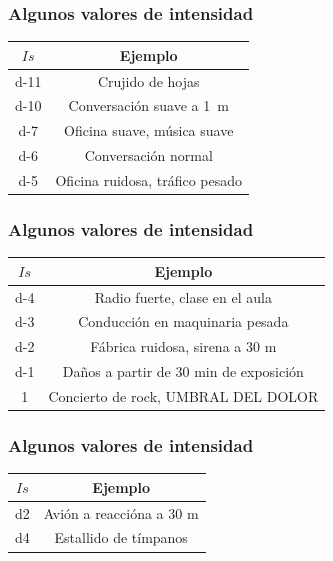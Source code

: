 \documentclass[14pt]{beamer}
\begin{document}
\begin{frame}
\frametitle{Algunos valores de intensidad}
\begin{table}
    \renewcommand{\arraystretch}{0.8}
    \centering
    \begin{tabular}{c | c }
        $Is$ & Ejemplo \\ \hline
        \num{d-11} & Crujido de hojas \\ \hline
        \num{d-10} & Conversación suave a \SI{1}{\meter} \\ \hline
        \num{d-7} & Oficina suave, música suave \\ \hline
        \num{d-6} & Conversación normal \\ \hline
        \num{d-5} & Oficina ruidosa, tráfico pesado \\ \hline
    \end{tabular}
\end{table}
\end{frame}
\begin{frame}
\frametitle{Algunos valores de intensidad}
\begin{table}
    \renewcommand{\arraystretch}{0.8}
    \centering
    \begin{tabular}{c | c }
        $Is$ & Ejemplo \\ \hline
        \num{d-4} & Radio fuerte, clase en el aula \\ \hline
        \num{d-3} & Conducción en maquinaria pesada \\ \hline
        \num{d-2} & Fábrica ruidosa, sirena a 30 m \\ \hline
        \num{d-1} & Daños a partir de 30 min de exposición \\ \hline
        \num{1} & Concierto de rock, UMBRAL DEL DOLOR \\ \hline
    \end{tabular}
\end{table}
\end{frame}
\begin{frame}
\frametitle{Algunos valores de intensidad}
\begin{table}
    \renewcommand{\arraystretch}{0.8}
    \centering
    \begin{tabular}{c | c }
        $Is$ & Ejemplo \\ \hline
        \num{d2} & Avión a reaccióna a 30 m \\ \hline
        \num{d4} & Estallido de tímpanos \\ \hline
    \end{tabular}
\end{table}
\end{frame}
\end{document}
